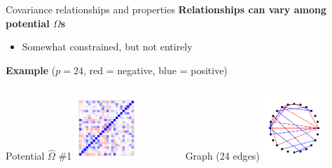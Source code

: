 \documentclass[professionalfonts]{beamer}
\begin{document}
\begin{frame}{Covariance relationships and properties}
\textbf{Relationships can vary among potential $\Omega$s}
\begin{itemize}
\item Somewhat constrained, but not entirely
\end{itemize}
\textbf{Example} ($p = 24$, {\color{red} red} = negative, {\color{blue} blue} = positive)
\begin{columns}
\begin{column}{0.45\textwidth}
\begin{center}
Potential $\widehat{\Omega}$ \#1
\includegraphics[width=90px]{figs/example-alt1-cor.pdf}
\end{center}
\end{column}
\begin{column}{0.45\textwidth}
\begin{center}
Graph (24 edges)
\includegraphics[width=90px]{figs/example-alt1-graph.pdf}
\end{center}
\end{column}
\end{columns}
\end{frame}
\end{document}
